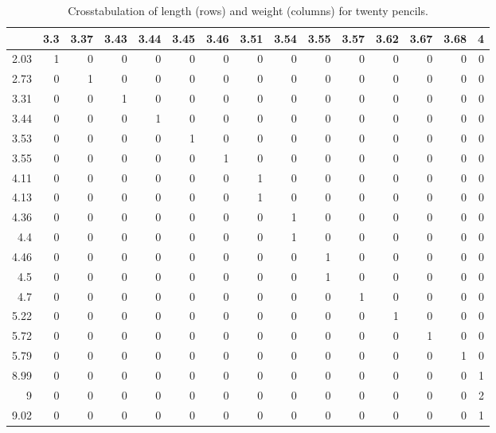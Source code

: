 \documentclass[]{report}\usepackage[]{graphicx}\usepackage[]{color}
\begin{document}
\begin{table}[ht]
\centering
\caption{Crosstabulation of length (rows) and weight (columns) for twenty pencils.} 
\label{tab:crosstable_4}
\begin{tabular}{rrrrrrrrrrrrrrr}
  \hline
 & 3.3 & 3.37 & 3.43 & 3.44 & 3.45 & 3.46 & 3.51 & 3.54 & 3.55 & 3.57 & 3.62 & 3.67 & 3.68 & 4 \\ 
  \hline
2.03 &   1 &   0 &   0 &   0 &   0 &   0 &   0 &   0 &   0 &   0 &   0 &   0 &   0 &   0 \\ 
  2.73 &   0 &   1 &   0 &   0 &   0 &   0 &   0 &   0 &   0 &   0 &   0 &   0 &   0 &   0 \\ 
  3.31 &   0 &   0 &   1 &   0 &   0 &   0 &   0 &   0 &   0 &   0 &   0 &   0 &   0 &   0 \\ 
  3.44 &   0 &   0 &   0 &   1 &   0 &   0 &   0 &   0 &   0 &   0 &   0 &   0 &   0 &   0 \\ 
  3.53 &   0 &   0 &   0 &   0 &   1 &   0 &   0 &   0 &   0 &   0 &   0 &   0 &   0 &   0 \\ 
  3.55 &   0 &   0 &   0 &   0 &   0 &   1 &   0 &   0 &   0 &   0 &   0 &   0 &   0 &   0 \\ 
  4.11 &   0 &   0 &   0 &   0 &   0 &   0 &   1 &   0 &   0 &   0 &   0 &   0 &   0 &   0 \\ 
  4.13 &   0 &   0 &   0 &   0 &   0 &   0 &   1 &   0 &   0 &   0 &   0 &   0 &   0 &   0 \\ 
  4.36 &   0 &   0 &   0 &   0 &   0 &   0 &   0 &   1 &   0 &   0 &   0 &   0 &   0 &   0 \\ 
  4.4 &   0 &   0 &   0 &   0 &   0 &   0 &   0 &   1 &   0 &   0 &   0 &   0 &   0 &   0 \\ 
  4.46 &   0 &   0 &   0 &   0 &   0 &   0 &   0 &   0 &   1 &   0 &   0 &   0 &   0 &   0 \\ 
  4.5 &   0 &   0 &   0 &   0 &   0 &   0 &   0 &   0 &   1 &   0 &   0 &   0 &   0 &   0 \\ 
  4.7 &   0 &   0 &   0 &   0 &   0 &   0 &   0 &   0 &   0 &   1 &   0 &   0 &   0 &   0 \\ 
  5.22 &   0 &   0 &   0 &   0 &   0 &   0 &   0 &   0 &   0 &   0 &   1 &   0 &   0 &   0 \\ 
  5.72 &   0 &   0 &   0 &   0 &   0 &   0 &   0 &   0 &   0 &   0 &   0 &   1 &   0 &   0 \\ 
  5.79 &   0 &   0 &   0 &   0 &   0 &   0 &   0 &   0 &   0 &   0 &   0 &   0 &   1 &   0 \\ 
  8.99 &   0 &   0 &   0 &   0 &   0 &   0 &   0 &   0 &   0 &   0 &   0 &   0 &   0 &   1 \\ 
  9 &   0 &   0 &   0 &   0 &   0 &   0 &   0 &   0 &   0 &   0 &   0 &   0 &   0 &   2 \\ 
  9.02 &   0 &   0 &   0 &   0 &   0 &   0 &   0 &   0 &   0 &   0 &   0 &   0 &   0 &   1 \\ 
   \hline
\end{tabular}
\end{table}
\end{document}
